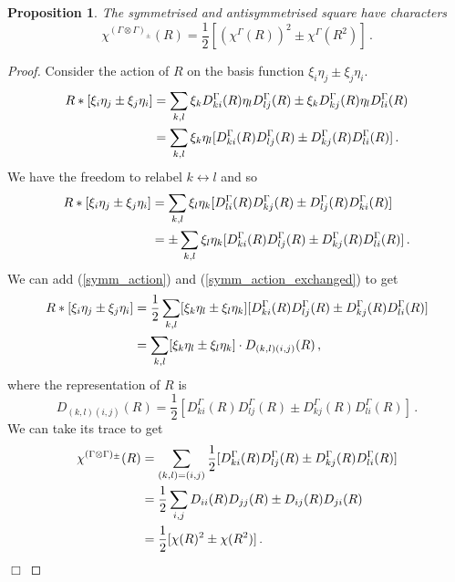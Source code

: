 \documentclass{article}
\theoremstyle{plain}\theoremheaderfont{\normalfont\itshape}\theorembodyfont{\rmfamily}\theoremseparator{.}\newtheorem*{rem}{Remark}\newtheorem*{ex}{Example}\newtheorem*{proof}{Proof}\newtheorem*{altp}{Alternative proof}
\theoremstyle{plain}\theoremheaderfont{\normalfont\bfseries}\theorembodyfont{\rmfamily}\theoremseparator{.}\newtheorem{thm}{Theorem}[section]\newtheorem{lem}[thm]{Lemma}\newtheorem{prop}[thm]{Proposition}\newtheorem*{cor}{Corollary}\newtheorem{defn}[thm]{Definition}\newtheorem{clm}[thm]{Claim}\newtheorem{clminproof}{Claim}\newtheorem*{law}{Law}\newtheorem{pos}[thm]{Postulate}
\theoremstyle{break}\theoremheaderfont{\normalfont\itshape}\theorembodyfont{\rmfamily}\theoremseparator{.\medskip}\newtheorem*{proofskip}{Proof}\newtheorem*{exs}{Examples}\newtheorem*{rems}{Remarks}
\theoremstyle{break}\theoremheaderfont{\normalfont\bfseries}\theorembodyfont{\rmfamily}\theoremseparator{.\medskip}\newtheorem{lemskip}[thm]{Lemma}\newtheorem{defnskip}[thm]{Definition}\newtheorem{propskip}[thm]{Proposition}\newtheorem{thmskip}[thm]{Theorem}
\numberwithin{equation}{section}
\newcommand{\qed}{\hfill\ensuremath{\Box}}
\begin{document}
    \begin{prop}
        The symmetrised and antisymmetrised square have characters
        \begin{equation}
            \chi^{(\Gamma\otimes\Gamma)_{\pm}}(R)=\frac{1}{2}[(\chi^\Gamma(R))^2\pm\chi^\Gamma(R^2)]\,.
        \end{equation}
    \end{prop}
    \begin{proof}
        Consider the action of \(R\) on the basis function \(\xi_i\eta_j\pm \xi_j\eta_i\).
        \begin{align}
            R*[\xi_i\eta_j\pm \xi_j\eta_i]&=\sum_{k,l}\xi_k D_{ki}^\Gamma(R)\eta_l D_{lj}^{\Gamma}(R) \pm \xi_k D_{kj}^\Gamma(R)\eta_l D_{li}^{\Gamma}(R) \notag \\
            &=\sum_{k,l} \xi_k\eta_l [D_{ki}^\Gamma(R) D_{lj}^{\Gamma}(R)\pm D_{kj}^\Gamma(R) D_{li}^{\Gamma}(R)]\,.\label{symm_action}
        \end{align}
        We have the freedom to relabel \(k\leftrightarrow l\) and so
        \begin{align}
            R*[\xi_i\eta_j\pm \xi_j\eta_i]&=\sum_{k,l}\xi_l\eta_k [D_{li}^\Gamma(R) D_{kj}^{\Gamma}(R)\pm D_{lj}^\Gamma(R) D_{ki}^{\Gamma}(R)] \notag \\
            &=\pm \sum_{k,l}\xi_l\eta_k [D_{ki}^\Gamma(R) D_{lj}^{\Gamma}(R) \pm D_{kj}^\Gamma(R) D_{li}^{\Gamma}(R)]\,.\label{symm_action_exchanged}
        \end{align}
        We can add (\ref{symm_action}) and (\ref{symm_action_exchanged}) to get
        \begin{align}
            R*[\xi_i\eta_j\pm \xi_j\eta_i]&=\frac{1}{2}\sum_{k,l}[\xi_k\eta_l\pm \xi_l\eta_k][D_{ki}^\Gamma(R) D_{lj}^{\Gamma}(R)\pm D_{kj}^\Gamma(R) D_{li}^{\Gamma}(R)] \notag\\
            &=\sum_{k,l}[\xi_k\eta_l\pm \xi_l\eta_k]\cdot D_{(k,l)(i,j)}(R)\,,
        \end{align}
        where the representation of \(R\) is
        \begin{equation}
            D_{(k,l)(i,j)}(R)=\frac{1}{2}[D_{ki}^\Gamma(R) D_{lj}^{\Gamma}(R)\pm D_{kj}^\Gamma(R) D_{li}^{\Gamma}(R)]\,.
        \end{equation}
        We can take its trace to get
        \begin{align}
            \chi^{(\Gamma\otimes\Gamma)_\pm}(R)&=\sum_{(k,l)=(i,j)}\frac{1}{2}[D_{ki}^\Gamma(R) D_{lj}^{\Gamma}(R)\pm D_{kj}^\Gamma(R) D_{li}^{\Gamma}(R)]\notag\\
            &=\frac{1}{2}\sum_{i,j}D_{ii}(R)D_{jj}(R)\pm D_{ij}(R)D_{ji}(R)\notag\\
            &=\frac{1}{2}[\chi(R)^2\pm\chi(R^2)]\,.
        \end{align}\qed
    \end{proof}
\end{document}
